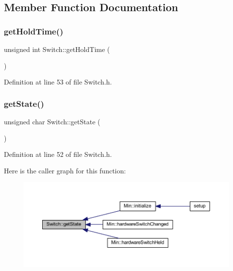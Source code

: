\subsection{Member Function Documentation}
\mbox{\label{class_switch_ac8a0a047de62c7769c32244f68328edd}} 
\subsubsection{\texorpdfstring{get\+Hold\+Time()}{getHoldTime()}}
{\footnotesize\ttfamily unsigned int Switch\+::get\+Hold\+Time (\begin{DoxyParamCaption}{ }\end{DoxyParamCaption})\hspace{0.3cm}{\ttfamily [inline]}}



Definition at line 53 of file Switch.\+h.

\mbox{\label{class_switch_a1a4f21940769f45910075ae6df70cae9}} 
\subsubsection{\texorpdfstring{get\+State()}{getState()}}
{\footnotesize\ttfamily unsigned char Switch\+::get\+State (\begin{DoxyParamCaption}{ }\end{DoxyParamCaption})\hspace{0.3cm}{\ttfamily [inline]}}



Definition at line 52 of file Switch.\+h.

Here is the caller graph for this function\+:
\nopagebreak
\begin{figure}[H]
\begin{center}
\leavevmode
\includegraphics[width=350pt]{class_switch_a1a4f21940769f45910075ae6df70cae9_icgraph}
\end{center}
\end{figure}
\mbox{\label{class_switch_a403dba5cc7695d5d19e62b87e87940fe}} 

